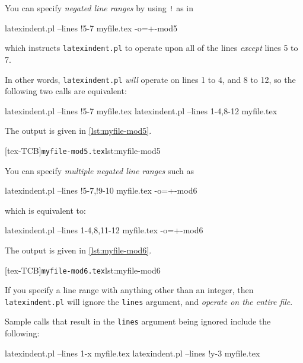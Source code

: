 \documentclass[10pt]{article}
\begin{document}
 \begin{example}
 You can specify \emph{negated line ranges} by using \texttt{!} as in

 \begin{commandshell}
latexindent.pl --lines !5-7 myfile.tex -o=+-mod5
\end{commandshell}

 which instructs \texttt{latexindent.pl} to operate upon all of the lines \emph{except}
 lines 5 to 7.

 In other words, \texttt{latexindent.pl} \emph{will} operate on lines 1 to 4, and 8 to
 12, so the following two calls are equivalent:

 \begin{commandshell}
latexindent.pl --lines !5-7 myfile.tex 
latexindent.pl --lines 1-4,8-12 myfile.tex 
\end{commandshell}

 The output is given in \cref{lst:myfile-mod5}.

 [tex-TCB]{\texttt{myfile-mod5.tex}}{lst:myfile-mod5}

 \end{example}

 \begin{example}
 You can specify \emph{multiple negated line ranges} such as

 \begin{commandshell}
latexindent.pl --lines !5-7,!9-10 myfile.tex -o=+-mod6
   \end{commandshell}

 which is equivalent to:

 \begin{commandshell}
latexindent.pl --lines 1-4,8,11-12 myfile.tex -o=+-mod6
   \end{commandshell}

 The output is given in \cref{lst:myfile-mod6}.

 [tex-TCB]{\texttt{myfile-mod6.tex}}{lst:myfile-mod6}
 \end{example}

 \begin{example}
 If you specify a line range with anything other than an integer, then
 \texttt{latexindent.pl} will ignore the \texttt{lines} argument, and \emph{operate on
 the entire file}.

 Sample calls that result in the \texttt{lines} argument being ignored include the
 following:

 \begin{commandshell}
latexindent.pl --lines 1-x myfile.tex 
latexindent.pl --lines !y-3 myfile.tex 
     \end{commandshell}

 \end{example}
\end{document}
